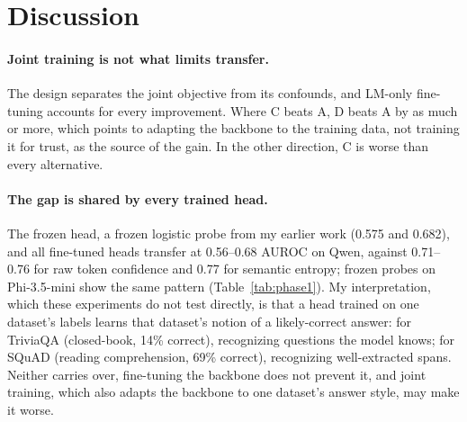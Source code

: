 \documentclass[11pt]{article}
\begin{document}
\begin{table}[t]
\centering
\small
{}
\caption{Earlier study: frozen logistic probes (final layer, earlier label rule) transferred to the other dataset, against the target dataset's raw confidence. Bold: CI excludes zero.}
\label{tab:phase1}
\end{table}

\section{Discussion}

\paragraph{Joint training is not what limits transfer.} The design separates the joint objective from its confounds, and LM-only fine-tuning accounts for every improvement. Where C beats A, D beats A by as much or more, which points to adapting the backbone to the training data, not training it for trust, as the source of the gain. In the other direction, C is worse than every alternative.

\paragraph{The gap is shared by every trained head.} The frozen head, a frozen logistic probe from my earlier work (0.575 and 0.682), and all fine-tuned heads transfer at 0.56--0.68 AUROC on Qwen, against 0.71--0.76 for raw token confidence and 0.77 for semantic entropy; frozen probes on Phi-3.5-mini show the same pattern (Table~\ref{tab:phase1}). My interpretation, which these experiments do not test directly, is that a head trained on one dataset's labels learns that dataset's notion of a likely-correct answer: for TriviaQA (closed-book, 14\% correct), recognizing questions the model knows; for SQuAD (reading comprehension, 69\% correct), recognizing well-extracted spans. Neither carries over, fine-tuning the backbone does not prevent it, and joint training, which also adapts the backbone to one dataset's answer style, may make it worse.
\end{document}
